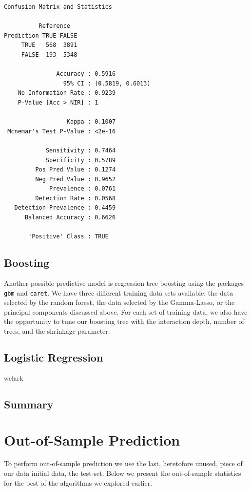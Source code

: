 \documentclass[11pt, fleqn]{article}
\begin{document}
\begin{verbatim}
Confusion Matrix and Statistics

          Reference
Prediction TRUE FALSE
     TRUE   568  3891
     FALSE  193  5348
                                          
               Accuracy : 0.5916          
                 95% CI : (0.5819, 0.6013)
    No Information Rate : 0.9239          
    P-Value [Acc > NIR] : 1               
                                          
                  Kappa : 0.1007          
 Mcnemar's Test P-Value : <2e-16          
                                          
            Sensitivity : 0.7464          
            Specificity : 0.5789          
         Pos Pred Value : 0.1274          
         Neg Pred Value : 0.9652          
             Prevalence : 0.0761          
         Detection Rate : 0.0568          
   Detection Prevalence : 0.4459          
      Balanced Accuracy : 0.6626          
                                          
       'Positive' Class : TRUE
\end{verbatim}

\subsection{Boosting}
Another possible predictive model is regression tree boosting using the packages \texttt{gbm} and \texttt{caret}. We have three different training data sets available: the data selected by the random forest, the data selected by the Gamma-Lasso, or the principal components discussed above. For each set of training data, we also have the opportunity to tune our boosting tree with the interaction depth, number of trees, and the shrinkage parameter.

\subsection{Logistic Regression}
wclark
\subsection{Summary}


\section{Out-of-Sample Prediction}
To perform out-of-sample prediction we use the last, heretofore unused, piece of our data initial data, the test-set.  Below we present the out-of-sample statistics for the best of the algorithms we explored earlier.
\end{document}
